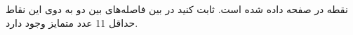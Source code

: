  نقطه در صفحه داده شده است. ثابت کنید در بین فاصله‌های بین دو به دوی این نقاط حداقل 11 عدد متمایز وجود دارد.